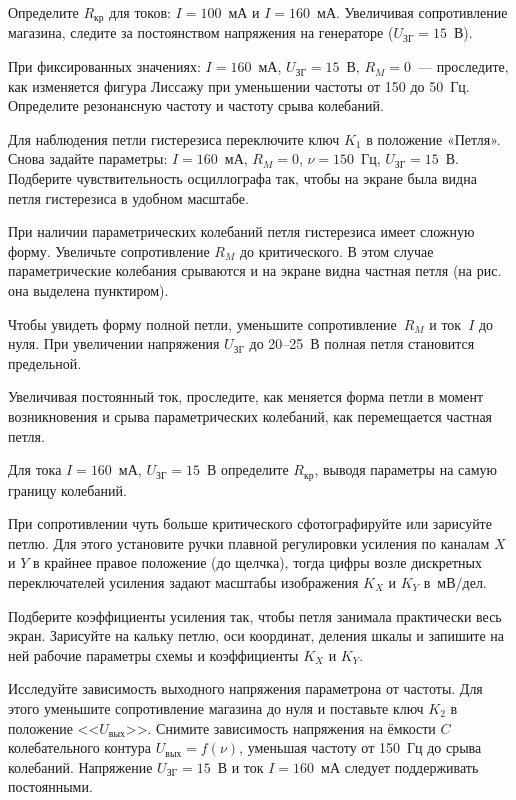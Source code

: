 \begin{lab:task}
\item
Определите $R_\text{кр}$ для токов: $I = 100$~мА и $I = 160$~мА. Увеличивая
сопротивление магазина, следите за постоянством напряжения на генераторе
($U_\text{ЗГ} = 15$~В).

\item
При фиксированных значениях: $I = 160$~мА, $U_\text{ЗГ} = 15$~В, $R_M = 0$~---
проследите, как изменяется фигура Лиссажу при уменьшении частоты от 150 до
50~Гц. Определите резонансную частоту и частоту срыва колебаний.

\item
Для наблюдения петли гистерезиса переключите ключ $K_1$ в положение «Петля».
Снова задайте параметры: $I = 160$~мА, $R_M = 0$, $\nu = 150$~Гц, $U_\text{ЗГ} =
15$~В. Подберите чувствительность осциллографа так, чтобы на экране была видна
петля гистерезиса в удобном масштабе.

При наличии параметрических колебаний петля гистерезиса имеет сложную форму.
Увеличьте сопротивление $R_M$ до критического. В этом случае параметрические
колебания срываются и на экране видна частная петля (на рис.~ она выделена пунктиром).

Чтобы увидеть форму полной петли, уменьшите сопротивление~$R_M$ и ток~$I$ до нуля.
При увеличении напряжения $U_\text{ЗГ}$ до 20--25~В полная петля становится
предельной.


\item
Увеличивая постоянный ток, проследите, как меняется форма петли в момент
возникновения и срыва параметрических колебаний, как перемещается частная петля.

\item
Для тока $I = 160$~мА, $U_\text{ЗГ} = 15$~В определите $R_\text{кр}$, выводя
параметры на самую границу колебаний.

\item
При сопротивлении чуть больше критического сфотографируйте или зарисуйте петлю.
Для этого установите
ручки плавной регулировки усиления по каналам $X$ и $Y$ в крайнее правое
положение (до щелчка), тогда цифры возле дискретных переключателей усиления
задают масштабы изображения $K_X$ и $K_Y$ в~мВ/дел.

Подберите коэффициенты усиления так, чтобы петля занимала практически весь
экран. Зарисуйте на кальку петлю, оси координат, деления шкалы и запишите на ней
рабочие параметры схемы и коэффициенты $K_X$ и $K_Y$.

\item Исследуйте зависимость выходного напряжения параметрона от частоты. Для
этого уменьшите сопротивление магазина до нуля и поставьте ключ $K_2$ в
положение <<$U_\text{вых}$>>. Снимите зависимость напряжения на ёмкости $C$
колебательного контура $U_\text{вых} = f(\nu)$, уменьшая частоту от 150~Гц до
срыва колебаний. Напряжение $U_\text{ЗГ} = 15$~В и ток $I = 160$~мА следует
поддерживать постоянными.


\end{lab:task}

